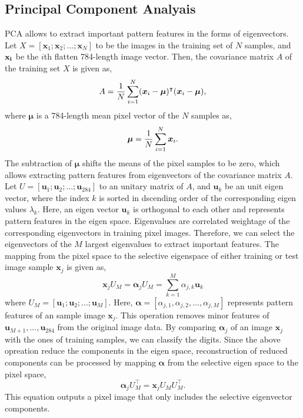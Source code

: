 \documentclass[conference]{IEEEtran}
\begin{document}
\subsection{Principal Component Analyais} %
\label{subsec:pca}
PCA allows to extract important pattern features in the forms of eigenvectors.
Let $X = [\boldsymbol{x}_1; \boldsymbol{x}_2; ... ; \boldsymbol{x}_N]$ to be the images in the training set of $N$ samples, and 
$\bf{x}_i$ be the $i$th flatten 784-length image vector.
Then, the covariance matrix $A$ of the training set $X$ is given as,
\begin{equation}
A = {1\over{N}}\sum_{i=1}^{N} (\boldsymbol{x}_i - \boldsymbol\mu)^\intercal (\boldsymbol{x}_i-\boldsymbol\mu),
\end{equation}
where $\boldsymbol\mu$ is a 784-length mean pixel vector of the $N$ samples as,
\begin{equation}
\boldsymbol\mu = {1\over{N}}\sum_{i=1}^{N} \boldsymbol{x}_i.
\end{equation}
The subtraction of $\boldsymbol\mu$ shifts the means of the pixel samples to be zero, which allows extracting pattern features from eigenvectors of the covariance matrix $A$.
Let $U = [\boldsymbol{u}_1; \boldsymbol{u}_2; ... ; \boldsymbol{u}_{284}]$ to an unitary matrix of $A$, and $\boldsymbol{u}_k$ be an unit eigen vector, where the index $k$ is sorted in dscending order of the corresponding eigen values $\lambda_k$. Here, an eigen vector $\boldsymbol{u}_k$ is orthogonal to each other and represents pattern features in the eigen space. 
Eigenvalues are correlated weightage of the corresponding eigenvectors in training pixel images. 
Therefore, we can select the eigenvectors of the $M$ largest eigenvalues to extract important features. 
The mapping from the pixel space to the selective eigenspace of either training or test image sample $\boldsymbol{x}_j$ is given as,
\begin{equation}
\boldsymbol{x}_j U_M = \boldsymbol\alpha_j U_M = \sum_{k=1}^{M} \alpha_{j,k} \boldsymbol{u}_k 
\end{equation}
where $U_M = [\boldsymbol{u}_1; \boldsymbol{u}_2; ... ; \boldsymbol{u}_{M}]$.
Here, $\boldsymbol\alpha = [\alpha_{j,1}, \alpha_{j,2}, ..., \alpha_{j,M}]$ represents pattern features of an sample image $\boldsymbol{x}_j$. 
This operation removes minor features of $\boldsymbol{u}_{M+1}, ..., \boldsymbol{u}_{284}$ from the original image data. 
By comparing $\boldsymbol\alpha_j$ of an image $\boldsymbol{x}_j$ with the ones of training samples, we can classify the digits.
Since the above opreation reduce the components in the eigen space, reconstruction of reduced components can be processed by mapping $\boldsymbol\alpha$ from the selective eigen space to the pixel space,
\begin{equation}
\boldsymbol\alpha_j U_M^\intercal = \boldsymbol{x}_j U_M U_M^\intercal.
\end{equation}
This equation outputs a pixel image that only includes the selective eigenvector components.
\end{document}
